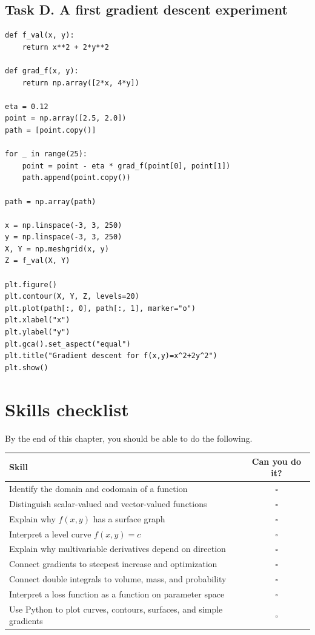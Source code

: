 \subsection*{Task D. A first gradient descent experiment}
\begin{lstlisting}[style=pythonstyle]
def f_val(x, y):
    return x**2 + 2*y**2

def grad_f(x, y):
    return np.array([2*x, 4*y])

eta = 0.12
point = np.array([2.5, 2.0])
path = [point.copy()]

for _ in range(25):
    point = point - eta * grad_f(point[0], point[1])
    path.append(point.copy())

path = np.array(path)

x = np.linspace(-3, 3, 250)
y = np.linspace(-3, 3, 250)
X, Y = np.meshgrid(x, y)
Z = f_val(X, Y)

plt.figure()
plt.contour(X, Y, Z, levels=20)
plt.plot(path[:, 0], path[:, 1], marker="o")
plt.xlabel("x")
plt.ylabel("y")
plt.gca().set_aspect("equal")
plt.title("Gradient descent for f(x,y)=x^2+2y^2")
plt.show()
\end{lstlisting}

\section{Skills checklist}

By the end of this chapter, you should be able to do the following.

\begin{center}
\begin{tabularx}{0.85\textwidth}{X c}
\toprule
\textbf{Skill} & \textbf{Can you do it?}\\
\midrule
Identify the domain and codomain of a function & $\square$\\
Distinguish scalar-valued and vector-valued functions & $\square$\\
Explain why $f(x,y)$ has a surface graph & $\square$\\
Interpret a level curve $f(x,y)=c$ & $\square$\\
Explain why multivariable derivatives depend on direction & $\square$\\
Connect gradients to steepest increase and optimization & $\square$\\
Connect double integrals to volume, mass, and probability & $\square$\\
Interpret a loss function as a function on parameter space & $\square$\\
Use Python to plot curves, contours, surfaces, and simple gradients & $\square$\\
\bottomrule
\end{tabularx}
\end{center}

